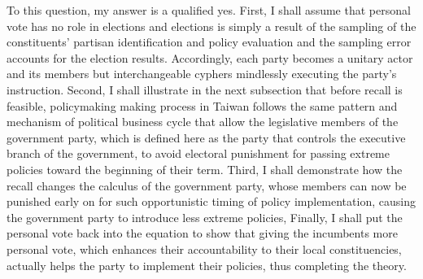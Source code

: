 \documentclass[hyphens, crop=false]{standalone}
\begin{document}
	To this question,
	my answer is a qualified yes.
	First,
	I shall assume that personal vote has no role in elections
	and elections is simply a result of the sampling of the constituents'
	partisan identification and policy evaluation
	and the sampling error accounts for the election results.
	Accordingly, each party becomes a unitary actor
	and its members but interchangeable cyphers mindlessly executing the party's instruction.
	Second,
	I shall illustrate in the next subsection that before recall is feasible,
	policymaking making process in Taiwan
	follows the same pattern and mechanism of political business cycle that allow
	the legislative members of the government party,
	which is
	defined here as
	the party that controls the executive branch of the government,
	to avoid electoral punishment for passing extreme policies toward the beginning of their term.
	Third,
	I shall demonstrate how
	the recall changes the calculus of the government party,
	whose members can now be punished early on for such opportunistic timing of policy implementation,
	causing the government party to introduce less extreme policies,
	Finally,
	I shall put the personal vote back into the equation
	to show that giving the incumbents more personal vote,
	which enhances their accountability to their local constituencies,
	actually helps the party to implement their policies,
	thus completing the theory.
	
	
	
\end{document}
